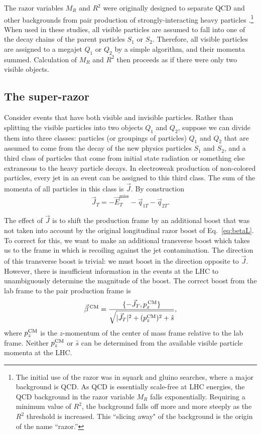 The razor variables $M_R$ and $R^2$ were originally designed to separate QCD and other 
backgrounds from pair production of strongly-interacting heavy particles \cite{Rogan:2010kb,Chatrchyan:2011ek,CMS:2012dwa,Chatrchyan:2012gq}.\footnote{The initial use of the razor was in squark and gluino searches,
where a major background is QCD. As QCD is essentially scale-free at LHC energies, the QCD background in the razor variable $M_R$ falls exponentially. Requiring a minimum value of $R^2$, the background falls off
more and more steeply as the $R^2$ threshold is increased. This ``slicing away" of the background is the
origin of the name ``razor.''}
When used in these studies, all visible particles are assumed to fall into one of the decay chains of the parent particles $S_1$ or $S_2$. Therefore, all visible particles are assigned to a megajet $Q_1$ or $Q_2$ by a
simple algorithm, and their momenta summed. Calculation of $M_R$ and $R^2$ then proceeds as if there were only two visible objects.

\subsection{The super-razor}

Consider events that have both visible and invisible particles. Rather than splitting the visible particles into two objects $Q_1$ and $Q_2$, suppose we can divide them into three classes: particles (or groupings of particles) $Q_1$ and $Q_2$ that are assumed to come from the decay of the new physics particles $S_1$ and $S_2$, and a third class of particles that come from initial state radiation or something else extraneous to
the heavy particle decays. In electroweak production of non-colored particles, every jet in an event can be assigned to this third class. The sum of the momenta of all particles in this class is $\vec{J}$. By construction
\begin{equation}
\vec{J}_T = -\vec{E}^\text{miss}_T-\vec{q}_{1T}-\vec{q}_{2T}.
\end{equation}

The effect of $\vec{J}$ is to shift the production frame by an additional boost that was not taken into account by the original longitudinal razor boost of Eq.~\eqref{eq:betaL}. To correct for this, we want to make an additional transverse boost which takes us to the frame in which is recoiling against the jet contamination. The direction of this transverse boost is trivial: we must boost in the direction opposite to $\vec{J}$. However, there is insufficient information in the events at the LHC to unambiguously determine the magnitude of the boost. The correct boost from the lab frame to the pair production frame is
\begin{equation}
\vec{\beta}^{\, \rm CM} = \frac{\{-\vec{J}_T,p^{\, \rm CM}_z\}}{\sqrt{|\vec{J}_T|^2+(p^{\rm CM}_z)^2+\hat{s}}}, \label{eq:truelabbeta}
\end{equation}
where $p^{\rm CM}_z$ is the $z$-momentum of the center of mass frame relative to the lab frame. Neither $p^{\rm CM}_z$ or $\hat{s}$ can be determined from the available visible particle momenta at the LHC. 

